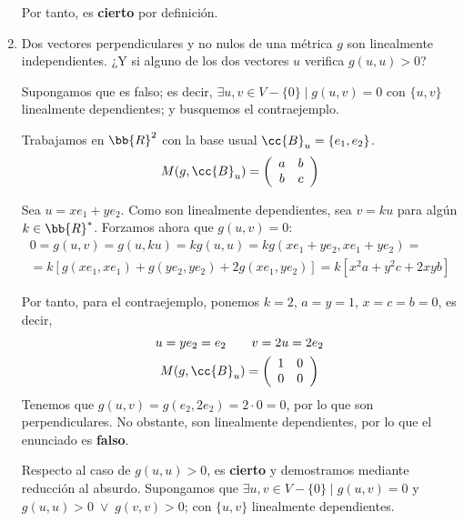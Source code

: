 \begin{ejercicio}
\begin{enumerate}
        Por tanto, es \textbf{cierto} por definición.

        \item Dos vectores perpendiculares y no nulos de una métrica $g$ son linealmente independientes. ¿Y si alguno de los dos vectores $u$ verifica $g(u,u) > 0$?

        Supongamos que es falso; es decir, $\exists u,v \in V-\{0\} \mid g(u,v)=0$ con $\{u,v\}$ linealmente dependientes; y busquemos el contraejemplo.
        
        Trabajamos en $\bb{R}^2$ con la base usual $\cc{B}_u=\{e_1, e_2\}$.
        \begin{equation*}
            M(g,\cc{B}_u) = \left(\begin{array}{cc}
                a & b \\
                b & c
            \end{array}\right)
        \end{equation*}
        
        Sea $u=xe_1 + ye_2$. Como son linealmente dependientes, sea $v=ku$ para algún $k\in\bb{R}^\ast$. Forzamos ahora que $g(u,v)=0$:
        \begin{multline*}
            0 = g(u,v) = g(u, ku) = kg(u,u) = kg(xe_1 + ye_2, xe_1 + ye_2) =\\=
            k[g(xe_1, xe_1) +g(ye_2, ye_2) +2g(xe_1, ye_2)]
            = k[x^2a+y^2c+2xyb]
        \end{multline*}

        Por tanto, para el contraejemplo, ponemos $k=2$, $a=y=1$, $x=c=b=0$, es decir,
        \begin{gather*}
            u=ye_2 = e_2 \qquad v=2u=2e_2
            \\
            M(g,\cc{B}_u) = \left(\begin{array}{cc}
                1 & 0 \\
                0 & 0
            \end{array}\right)
        \end{gather*}
        Tenemos que $g(u,v)=g(e_2, 2e_2)=2\cdot 0 = 0$, por lo que son perpendiculares. No obstante, son linealmente dependientes, por lo que el enunciado es \textbf{falso}.


        Respecto al caso de $g(u,u)>0$, es \textbf{cierto} y demostramos mediante reducción al absurdo. Supongamos que $\exists u,v \in V-\{0\} \mid g(u,v)=0$ y $g(u,u)>0\;\lor\;g(v,v)>0$; con $\{u,v\}$ linealmente dependientes.


\end{enumerate}
\end{ejercicio}

